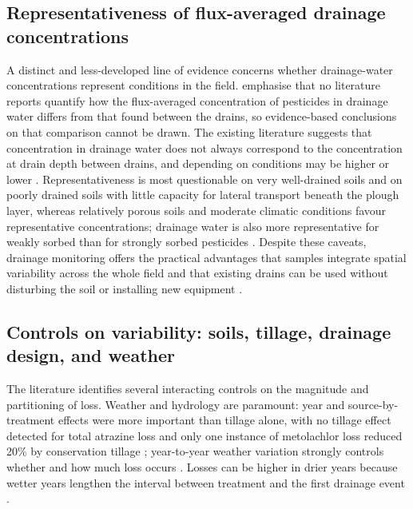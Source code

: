 \subsection{Representativeness of flux-averaged drainage concentrations}
A distinct and less-developed line of evidence concerns whether drainage-water concentrations represent conditions in the field. \textcite{Jacobsen2007} emphasise that no literature reports quantify how the flux-averaged concentration of pesticides in drainage water differs from that found between the drains, so evidence-based conclusions on that comparison cannot be drawn. The existing literature suggests that concentration in drainage water does not always correspond to the concentration at drain depth between drains, and depending on conditions may be higher or lower \parencite{Jacobsen2007}. Representativeness is most questionable on very well-drained soils and on poorly drained soils with little capacity for lateral transport beneath the plough layer, whereas relatively porous soils and moderate climatic conditions favour representative concentrations; drainage water is also more representative for weakly sorbed than for strongly sorbed pesticides \parencite{Jacobsen2007}. Despite these caveats, drainage monitoring offers the practical advantages that samples integrate spatial variability across the whole field and that existing drains can be used without disturbing the soil or installing new equipment \parencite{Jacobsen2007}.

\subsection{Controls on variability: soils, tillage, drainage design, and weather}
The literature identifies several interacting controls on the magnitude and partitioning of loss. Weather and hydrology are paramount: year and source-by-treatment effects were more important than tillage alone, with no tillage effect detected for total atrazine loss and only one instance of metolachlor loss reduced 20\% by conservation tillage \parencite{GAYNOR1995}; year-to-year weather variation strongly controls whether and how much loss occurs \parencite{Kladivko2001}. Losses can be higher in drier years because wetter years lengthen the interval between treatment and the first drainage event \parencite{Dousset2004}.

